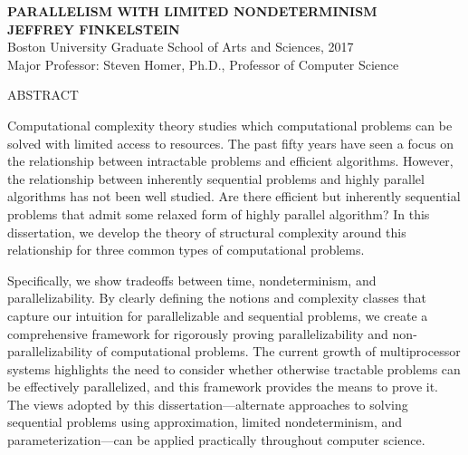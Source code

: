 \newenvironment{abstractpage}
  {\thispagestyle{plain}}
  {}

\begin{abstractpage}
  \begin{center}
    \textbf{\uppercase{Parallelism with limited nondeterminism}}\\
    \textbf{\uppercase{Jeffrey Finkelstein}}\\
    Boston University Graduate School of Arts and Sciences, 2017\\
    Major Professor: Steven Homer, Ph.D., Professor of Computer Science
  \end{center}
  \begin{center}
    ABSTRACT
  \end{center}
  Computational complexity theory studies which computational problems can be solved with limited access to resources.
  The past fifty years have seen a focus on the relationship between intractable problems and efficient algorithms.
  However, the relationship between inherently sequential problems and highly parallel algorithms has not been well studied.
  Are there efficient but inherently sequential problems that admit some relaxed form of highly parallel algorithm?
  In this dissertation, we develop the theory of structural complexity around this relationship for three common types of computational problems.

  Specifically, we show tradeoffs between time, nondeterminism, and parallelizability.
  By clearly defining the notions and complexity classes that capture our intuition for parallelizable and sequential problems, we create a comprehensive framework for rigorously proving parallelizability and non-parallelizability of computational problems.
  The current growth of multiprocessor systems highlights the need to consider whether otherwise tractable problems can be effectively parallelized, and this framework provides the means to prove it.
  The views adopted by this dissertation---alternate approaches to solving sequential problems using approximation, limited nondeterminism, and parameterization---can be applied practically throughout computer science.
\end{abstractpage}

